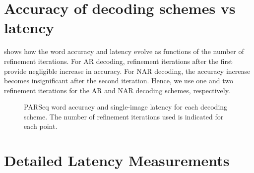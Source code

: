 \section{Accuracy of decoding schemes vs latency}
\label{sec:acc-vs-latency}

 shows how the word accuracy and latency evolve as functions of the number of refinement iterations. For AR decoding, refinement iterations after the first provide negligible increase in accuracy. For NAR decoding, the accuracy increase becomes insignificant after the second iteration. Hence, we use one and two refinement iterations for the AR and NAR decoding schemes, respectively.

\begin{figure}[htbp]
  \centering


  \caption[PARSeq word accuracy and single-image latency for each decoding scheme.]{PARSeq word accuracy and single-image latency for each decoding scheme. The number of refinement iterations used is indicated for each point.}
  \label{fig:ablation-decoding}
\end{figure}

\section{Detailed Latency Measurements}
\label{ch:latency-measurements}

